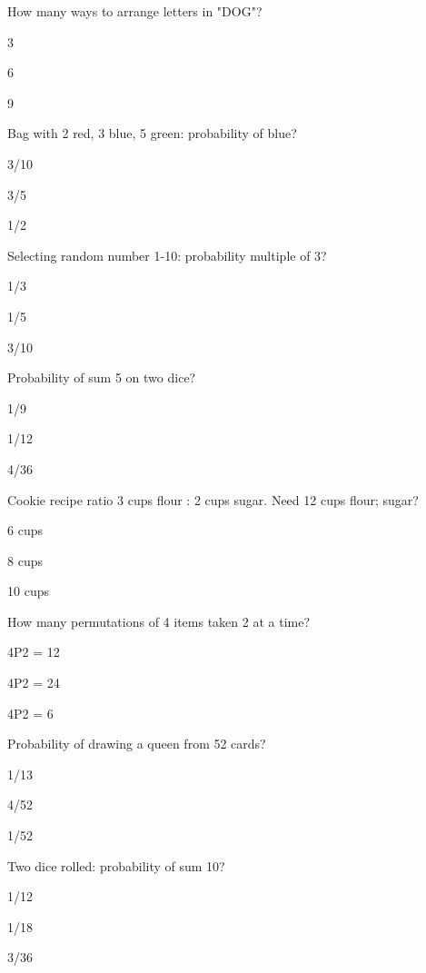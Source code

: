 \begin{enhancedmcq}{How many ways to arrange letters in "DOG"?}
\item 3
\item 6
\item 9

\end{enhancedmcq}
\begin{enhancedmcq}{Bag with 2 red, 3 blue, 5 green: probability of blue?}
\item 3/10
\item 3/5
\item 1/2

\end{enhancedmcq}
\begin{enhancedmcq}{Selecting random number 1-10: probability multiple of 3?}
\item 1/3
\item 1/5
\item 3/10

\end{enhancedmcq}
\begin{enhancedmcq}{Probability of sum 5 on two dice?}
\item 1/9
\item 1/12
\item 4/36

\end{enhancedmcq}
\begin{enhancedmcq}{Cookie recipe ratio 3 cups flour : 2 cups sugar. Need 12 cups flour; sugar?}
\item 6 cups
\item 8 cups
\item 10 cups

\end{enhancedmcq}
\begin{enhancedmcq}{How many permutations of 4 items taken 2 at a time?}
\item 4P2 = 12
\item 4P2 = 24
\item 4P2 = 6

\end{enhancedmcq}
\begin{enhancedmcq}{Probability of drawing a queen from 52 cards?}
\item 1/13
\item 4/52
\item 1/52

\end{enhancedmcq}
\begin{enhancedmcq}{Two dice rolled: probability of sum 10?}
\item 1/12
\item 1/18
\item 3/36

\end{enhancedmcq}
